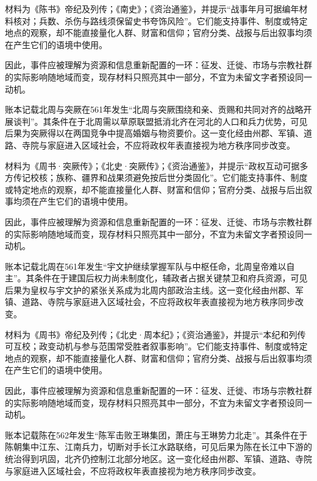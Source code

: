 材料为《陈书》帝纪及列传；《南史》；《资治通鉴》，并提示“战事年月可据编年材料核对；兵数、杀伤与路线须保留史书夸饰风险”。它们能支持事件、制度或特定地点的观察，却不能直接量化人群、财富和信仰；官府分类、战报与后出叙事均须在产生它们的语境中使用。

因此，事件应被理解为资源和信息重新配置的一环：征发、迁徙、市场与宗教社群的实际影响随地域而变，现存材料只照亮其中一部分，不宜为未留文字者预设同一动机。

账本记载北周与突厥在561年发生“北周与突厥围绕和亲、贡赐和共同对齐的战略开展谈判”。其条件在于北周需以草原联盟抵消北齐在河北的人口和兵力优势，可见后果为突厥得以在两国竞争中提高婚姻与物资要价。这一变化经由州郡、军镇、道路、寺院与家庭进入区域社会，不应将政权年表直接视为地方秩序同步改变。

材料为《周书·突厥传》；《北史·突厥传》；《资治通鉴》，并提示“政权互动可据多方传记校核；族称、疆界和战果须避免按后世分类固化”。它们能支持事件、制度或特定地点的观察，却不能直接量化人群、财富和信仰；官府分类、战报与后出叙事均须在产生它们的语境中使用。

因此，事件应被理解为资源和信息重新配置的一环：征发、迁徙、市场与宗教社群的实际影响随地域而变，现存材料只照亮其中一部分，不宜为未留文字者预设同一动机。

账本记载北周在561年发生“宇文护继续掌握军队与中枢任命，北周皇帝难以自主”。其条件在于建国后权力尚未制度化，辅政者占据关键禁卫和府兵资源，可见后果为皇权与宇文护的紧张关系成为北周内部政治主线。这一变化经由州郡、军镇、道路、寺院与家庭进入区域社会，不应将政权年表直接视为地方秩序同步改变。

材料为《周书》帝纪及列传；《北史·周本纪》；《资治通鉴》，并提示“本纪和列传可互校；政变动机与参与范围常受胜者叙事影响”。它们能支持事件、制度或特定地点的观察，却不能直接量化人群、财富和信仰；官府分类、战报与后出叙事均须在产生它们的语境中使用。

因此，事件应被理解为资源和信息重新配置的一环：征发、迁徙、市场与宗教社群的实际影响随地域而变，现存材料只照亮其中一部分，不宜为未留文字者预设同一动机。

账本记载陈在562年发生“陈军击败王琳集团，萧庄与王琳势力北走”。其条件在于陈朝集中江东、江南兵力，切断对手长江水路联络，可见后果为陈在长江中下游的统治得到巩固，北齐仍控制江北部分地区。这一变化经由州郡、军镇、道路、寺院与家庭进入区域社会，不应将政权年表直接视为地方秩序同步改变。

